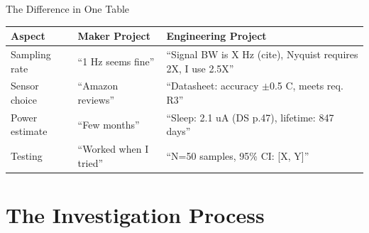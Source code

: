 \documentclass[aspectratio=169,11pt]{beamer}
\begin{document}
\begin{frame}{The Difference in One Table}
    \begin{table}
        \centering
        \small
        \begin{tabular}{@{}p{3cm}p{5cm}p{5.5cm}@{}}
            \toprule
            \textbf{Aspect} & \textbf{Maker Project} & \textbf{Engineering Project} \\
            \midrule
            Sampling rate & ``1 Hz seems fine'' & ``Signal BW is X Hz (cite), Nyquist requires 2X, I use 2.5X'' \\
            \addlinespace
            Sensor choice & ``Amazon reviews'' & ``Datasheet: accuracy $\pm$0.5 C, meets req. R3'' \\
            \addlinespace
            Power estimate & ``Few months'' & ``Sleep: 2.1 uA (DS p.47), lifetime: 847 days'' \\
            \addlinespace
            Testing & ``Worked when I tried'' & ``N=50 samples, 95\% CI: [X, Y]'' \\
            \bottomrule
        \end{tabular}
    \end{table}
\end{frame}

\section{The Investigation Process}
\end{document}
